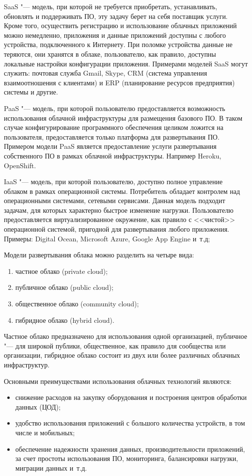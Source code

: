SaaS "--- модель, при которой не требуется приобретать, устанавливать, обновлять и поддерживать ПО, эту задачу берет на себя поставщик услуги.
Кроме того, осуществить регистрацию и использование облачных приложений можно немедленно, приложения и данные приложений доступны с любого устройства, подключенного к Интернету.
При поломке устройства данные не теряются, они хранятся в облаке, пользователю, как правило, доступны локальные настройки конфигурации приложения.
Примерами моделей SaaS могут служить: почтовая служба Gmail, Skype, CRM (система управления взаимоотношения с клиентами) и ERP (планирование ресурсов предприятия) системы и другие.

PaaS "--- модель, при которой пользователю предоставляется возможность использования облачной инфраструктуры для размещения базового ПО.
В таком случае конфигурирование программного обеспечения целиком ложится на пользователя, предоставляется только платформа для развертывания ПО.
Примером модели PaaS является предоставление услуги развертывания собственного ПО в рамках облачной инфраструктуры.
Например Heroku, OpenShift.

IaaS "--- модель, при которой пользователю, доступно полное управление облаком в рамках операционной системы.
Потребитель обладает контролем над операционными системами, сетевыми сервисами.
Данная модель подходит задачам, для которых характерно быстрое изменение нагрузки.
Пользователю предоставляется виртуализированное окружение, как правило с <<чистой>> операционной системой, пригодной для развертывания любого приложения.
Примеры: Digital Ocean, Microsoft Azure, Google App Engine и~т.д;

Модели развертывания облака можно разделить на четыре вида:
\begin{enumerate}
    \item частное облако (private cloud);
    \item публичное облако (public cloud);
    \item общественное облако (community cloud);
    \item гибридное облако (hybrid cloud).
\end{enumerate}

Частное облако предназначено для использования одной организацией, публичное "--- для широкой публики, общественное, как правило для сообщества или организации, гибридное облако состоит из двух или более различных облачных инфраструктур.

Основными преимуществами использования облачных технологий являются:
\begin{itemize}
    \item снижение расходов на закупку оборудования и построения центров обработки данных (ЦОД);
    \item удобство использования приложений с большого количества устройств, в том числе и мобильных;
    \item обеспечение надежности хранения данных, производительности приложений, за счет простоты использования ПО, мониторинга, балансировки нагрузки, миграции данных и~т.д.
\end{itemize}

